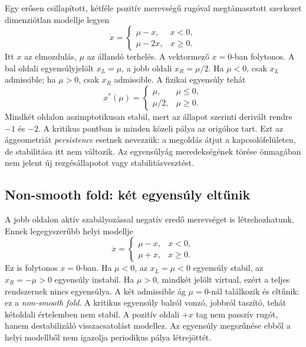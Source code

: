 Egy erősen csillapított, kétféle pozitív merevségű rugóval megtámasztott szerkezet dimenziótlan modellje legyen
\begin{equation}
 \dot x=\begin{cases}\mu-x,&x<0,\\ \mu-2x,&x\geq0.\end{cases}
 \label{eq:beb_persistence}
\end{equation}
Itt $x$ az elmozdulás, $\mu$ az állandó terhelés. A vektormező $x=0$-ban folytonos. A bal oldali egyensúlyjelölt $x_L=\mu$, a jobb oldali $x_R=\mu/2$. Ha $\mu<0$, csak $x_L$ admissible; ha $\mu>0$, csak $x_R$ admissible. A fizikai egyensúly tehát
\[
 x^*(\mu)=\begin{cases}\mu,&\mu\leq0,\\\mu/2,&\mu\geq0.\end{cases}
\]
Mindkét oldalon aszimptotikusan stabil, mert az állapot szerinti derivált rendre $-1$ és $-2$. A kritikus pontban is minden közeli pálya az origóhoz tart. Ezt az ággeometriát \emph{persistence} esetnek nevezzük: a megoldás átjut a kapcsolófelületen, de stabilitása itt nem változik. Az egyensúlyág meredekségének törése önmagában nem jelent új rezgésállapotot vagy stabilitásvesztést.
\exampleend

\subsection{Non-smooth fold: két egyensúly eltűnik}
\examplebody

A jobb oldalon aktív szabályozással negatív eredő merevséget is létrehozhatunk. Ennek legegyszerűbb helyi modellje
\begin{equation}
 \dot x=\begin{cases}\mu-x,&x<0,\\\mu+x,&x\geq0.\end{cases}
 \label{eq:beb_fold}
\end{equation}
Ez is folytonos $x=0$-ban. Ha $\mu<0$, az $x_L=\mu<0$ egyensúly stabil, az $x_R=-\mu>0$ egyensúly instabil. Ha $\mu>0$, mindkét jelölt virtual, ezért a teljes rendszernek nincs egyensúlya. A két admissible ág $\mu=0$-nál találkozik és eltűnik: ez a \emph{non-smooth fold}. A kritikus egyensúly balról vonzó, jobbról taszító, tehát kétoldali értelemben nem stabil. A pozitív oldali $+x$ tag nem passzív rugót, hanem destabilizáló visszacsatolást modellez. Az egyensúly megszűnése ebből a helyi modellből nem igazolja periodikus pálya létrejöttét.
\exampleend

